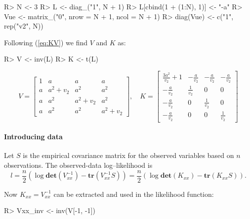 \begin{Schunk}
\begin{Sinput}
R> N <- 3
R> L <- diag_("1", N + 1)
R> L[cbind(1 + (1:N), 1)] <- "-a"
R> Vue <- matrix_("0", nrow = N + 1, ncol = N + 1)
R> diag(Vue) <- c("1", rep("v2", N))
\end{Sinput}
\end{Schunk}

Following (\ref{eq:KV}) we find \(V\) and \(K\) as:

\begin{Schunk}
\begin{Sinput}
R> V <- inv(L) %
R> K <- t(L) %
\end{Sinput}
\end{Schunk}

\[
V = \left[\begin{matrix}1 & a & a & a\\a & a^{2} + v_{2} & a^{2} & a^{2}\\a & a^{2} & a^{2} + v_{2} & a^{2}\\a & a^{2} & a^{2} & a^{2} + v_{2}\end{matrix}\right], \quad K = \left[\begin{matrix}\frac{3 a^{2}}{v_{2}} + 1 & - \frac{a}{v_{2}} & - \frac{a}{v_{2}} & - \frac{a}{v_{2}}\\- \frac{a}{v_{2}} & \frac{1}{v_{2}} & 0 & 0\\- \frac{a}{v_{2}} & 0 & \frac{1}{v_{2}} & 0\\- \frac{a}{v_{2}} & 0 & 0 & \frac{1}{v_{2}}\end{matrix}\right]
\]

\hypertarget{introducing-data}{%
\paragraph{Introducing data}\label{introducing-data}}

Let \(S\) is the empirical covariance matrix for the observed variables
based on \(n\) observations. The observed-data log--likelihood is \[
  l 
  = \frac{n}{2} (\log \mathbf{det}(V_{xx}^{-1}) - \mathbf{tr}(V_{xx}^{-1} S))
  = \frac{n}{2} (\log \mathbf{det}(K_{xx}) - \mathbf{tr}(K_{xx} S)).
\]

Now \(K_{xx}= V_{xx}^{-1}\) can be extracted and used in the likelihood
function:

\begin{Schunk}
\begin{Sinput}
R> Vxx_inv <- inv(V[-1, -1])
\end{Sinput}
\end{Schunk}

